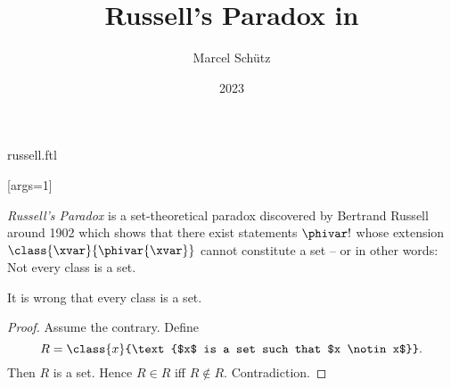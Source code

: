 \documentclass{stex}
\begin{document}
\title{Russell's Paradox in \Naproche}
\author{Marcel Schütz}
\date{2023}
\maketitle
\begin{smodule}{russell.ftl}

  [args=1]{\maincomp{\varphi}}

  \noindent \emph{Russell's Paradox} is a set-theoretical paradox discovered by Bertrand Russell around 1902 \cite[chapter XV]{Frege1980} which shows that there exist statements $\phivar!$ whose extension $\class{\xvar}{\phivar{\xvar}}$ cannot constitute a set – or in other words: Not every class is a set.

  \begin{forthel}
    \begin{theorem*}\label{russell_paradox}
      It is wrong that every class is a set.
    \end{theorem*}
    \begin{proof}
      Assume the contrary.
      Define \[R = \class{x}{\text{$x$ is a set such that $x \notin x$}}.\]
      Then $R$ is a set.
      Hence $R \in R$ iff $R \notin R$.
      Contradiction.
    \end{proof}
  \end{forthel}
\end{smodule}
\printbibliography
\end{document}
